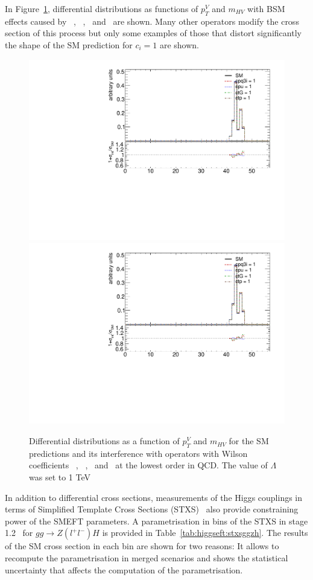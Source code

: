 In Figure~\ref{fig:higgseft:ggzh}, differential distributions as functions of $p_{T}^{V}$ and $m_{HV}$  with BSM effects caused by \cpqi\ , \cpu\ , \ctG\ and \ctp\ are shown.  Many other operators modify the cross section of this process but only some examples of those that distort significantly the shape of the SM prediction for  $c_i=1$ are shown.

\begin{figure}
\includegraphics[width=0.49\linewidth,page=7]{figures/kinematics_ggHll_np0.pdf}
\includegraphics[width=0.49\linewidth,page=10]{figures/kinematics_ggHll_np0.pdf}
\label{fig:higgseft:ggzh}
\caption{Differential distributions as a function of $p_{T}^{V}$ and $m_{HV}$ for the SM predictions and its interference with operators with Wilson coefficients \ctG\ , \cpd\ , \cpu\ and \ctp\  at the lowest order in QCD. The value of $\Lambda$ was set to 1 TeV}  
\end{figure}

In addition to differential cross sections, measurements  of the Higgs couplings in terms of Simplified Template Cross Sections (STXS)~\cite{deFlorian:2016spz} also provide constraining power of the SMEFT parameters. A parametrisation in bins of the STXS in stage 1.2~\cite{Berger:2019wnu}  for $gg\to Z(l^{+}l^{-})H$  is provided in Table~\ref{tab:higgseft:stxsggzh}. The results of	the SM cross section in each bin are shown for two reasons: It allows to recompute the parametrisation in merged scenarios and shows the statistical uncertainty that affects the computation of the parametrisation.

